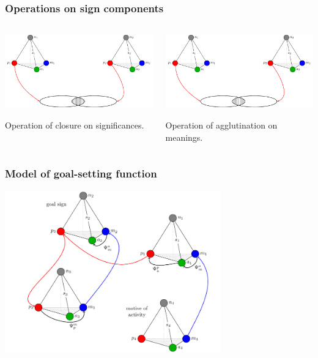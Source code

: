 \documentclass[default]{beamer}
\begin{document}
	\begin{frame}
		\frametitle{Operations on sign components}
		
		\begin{columns}
			\begin{column}{0.5\textwidth}
				\centering
				\includegraphics[page=7,width=\textwidth]{signs/sign_relations}
				\par\bigskip
				Operation of closure on significances.
			\end{column}
			\begin{column}{0.5\textwidth}
				\includegraphics[page=8,width=\textwidth]{signs/sign_relations}
				\par\bigskip
				Operation of agglutination on meanings.
			\end{column}
		\end{columns}
	\end{frame}	

	\begin{frame}
		\frametitle{Model of goal-setting function}
		\centering
		\includegraphics[width=0.7\textwidth]{algo/goal_set_alg}
	\end{frame}	
											
\end{document}
